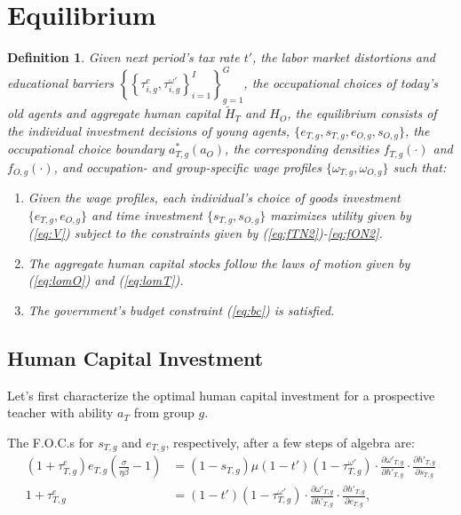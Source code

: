 \documentclass[onehalfspacing,11pt]{article}
\newtheorem{df}{Definition}
\begin{document}
	\section{Equilibrium}\label{sec:equilibrium}
	\begin{df}
		Given next period's tax rate $t'$, the labor market distortions and educational barriers $\left\{ \left\{ \tau_{i,g}^e,\tau_{i,g}^{\omega '} \right\}_{i=1}^I \right\}_{g=1}^G$, the occupational choices of today's old agents and aggregate human capital $\widetilde{H}_{T}$ and ${H}_{O}$, the equilibrium consists of the individual investment decisions of young agents, $\{e_{T,g}, s_{T,g}, e_{O,g}, s_{O,g}\}$, the occupational choice boundary $a^*_{T,g}(a_O)$, the corresponding densities $f_{T,g}\left(\cdot\right)$ and $f_{O,g}\left(\cdot\right)$, and occupation- and group-specific wage profiles $\{\omega_{T,g}, \omega_{O,g}\}$ such that:
		\begin{enumerate}
			\item Given the wage profiles, each individual's choice of goods investment $\{e_{T,g}, e_{O,g}\}$ and time investment $\{s_{T,g}, s_{O,g}\}$ maximizes utility given by (\ref{eq:V}) subject to the constraints given by (\ref{eq:fTN2})-\eqref{eq:fON2}.
			\item The aggregate human capital stocks follow the laws of motion given by (\ref{eq:lomO}) and (\ref{eq:lomT}).
			\item The government's budget constraint (\ref{eq:bc}) is satisfied.
		\end{enumerate}
	\end{df}
	
	\subsection{Human Capital Investment}
	Let's first characterize the optimal human capital investment for a prospective teacher with ability $a_T$ from group $g$.%
	
	The F.O.C.s for $s_{T,g}$ and $e_{T,g}$, respectively, after a few steps of algebra are:
	\begin{align}
		\label{eq:foc-e}
		(1+\tau^e_{T,g}) e_{T,g} \left( \tfrac{\sigma}{\eta\beta }-1 \right) & = \left(1-s_{T,g}\right) \mu(1-t')(1-\tau^{\omega '}_{T,g}) \cdot \tfrac{\partial \omega'_{T,g}}{\partial h'_{T,g}} \cdot \tfrac{\partial h'_{T,g}}{\partial s_{T,g}}\\
		\label{eq:foc-s}
		1+\tau^e_{T,g} & = (1-t')(1-\tau^{\omega '}_{T,g})\cdot \tfrac{\partial \omega'_{T,g}}{\partial h'_{T,g}}\cdot \tfrac{\partial h'_{T,g}}{\partial e_{T,g}},
	\end{align}
	
\end{document}
